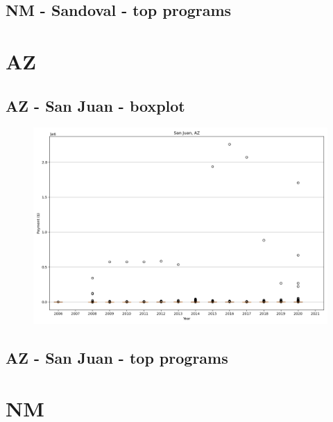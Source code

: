 \subsection*{NM - Sandoval - top programs}

\newpage
\section*{AZ}
\subsection*{AZ - San Juan - boxplot}
\begin{figure}[h]
\centering
\includegraphics[width=7in]{../output/boxplots/counties/San Juan-AZ_boxplot.png}
\end{figure}


\subsection*{AZ - San Juan - top programs}

\newpage
\section*{NM}
